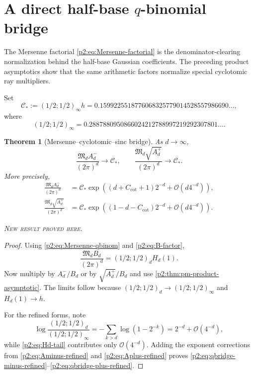 \documentclass[11pt,oneside]{article}
\newtheorem{theorem}{Theorem}[section]
\theoremstyle{definition}
\theoremstyle{remark}
\newcommand{\bigO}{\mathcal O}
\newcommand{\newresult}{\textcolor{newgreen}{\textsc{New result proved here.}}}
\begin{document}
\section{A direct half-base $q$-binomial bridge}\label{p2:sec:qbridge}

The Mersenne factorial \eqref{p2:eq:Mersenne-factorial} is the denominator-clearing
normalization behind the half-base Gaussian coefficients. The preceding product
asymptotics show that the same arithmetic factors normalize special cyclotomic
ray multipliers.

Set
\begin{equation}
 \mathcal C_*:=(1/2;1/2)_\infty h
 =0.1599225518776068325779014528557986690\ldots,
 \label{p2:eq:Cstar}
\end{equation}
where
\begin{equation}
 (1/2;1/2)_\infty
 =0.2887880950866024212788997219292307801\ldots.
 \label{p2:eq:qpoch-number}
\end{equation}

\begin{theorem}[Mersenne--cyclotomic--sinc bridge]\label{p2:thm:qbridge}
As $d\to\infty$,
\begin{equation}
 \boxed{
 \frac{\mathfrak M_dA_d^-}{(2\pi)^d}\longrightarrow\mathcal C_*},
 \qquad
 \boxed{
 \frac{\mathfrak M_d\sqrt{A_d^+}}{(2\pi)^d}\longrightarrow\mathcal C_*}.
 \label{p2:eq:qbridge-limits}
\end{equation}
More precisely,
\begin{align}
 \frac{\mathfrak M_dA_d^-}{(2\pi)^d}
 &=\mathcal C_*
 \exp\!\left((d+C_{\cot}+1)2^{-d}+\bigO(d4^{-d})\right),
 \label{p2:eq:qbridge-minus-refined}\\
 \frac{\mathfrak M_d\sqrt{A_d^+}}{(2\pi)^d}
 &=\mathcal C_*
 \exp\!\left((1-d-C_{\cot})2^{-d}+\bigO(d4^{-d})\right).
 \label{p2:eq:qbridge-plus-refined}
\end{align}

\smallskip\noindent\newresult
\end{theorem}

\begin{proof}
Using \eqref{p2:eq:Mersenne-qbinom} and \eqref{p2:eq:B-factor},
\[
 \frac{\mathfrak M_dB_d}{(2\pi)^d}
 =(1/2;1/2)_dH_d(1).
\]
Now multiply by $A_d^-/B_d$ or by $\sqrt{A_d^+}/B_d$ and use
\cref{p2:thm:pm-product-asymptotic}. The limits follow because
$(1/2;1/2)_d\to(1/2;1/2)_\infty$ and $H_d(1)\to h$.

For the refined forms, note
\[
 \log\frac{(1/2;1/2)_d}{(1/2;1/2)_\infty}
 =-\sum_{k>d}\log(1-2^{-k})=2^{-d}+\bigO(4^{-d}),
\]
while \eqref{p2:eq:Hd-tail} contributes only $\bigO(4^{-d})$. Adding the exponent
corrections from \eqref{p2:eq:Aminus-refined} and \eqref{p2:eq:Aplus-refined} proves
\eqref{p2:eq:qbridge-minus-refined}--\eqref{p2:eq:qbridge-plus-refined}.
\end{proof}
\end{document}
